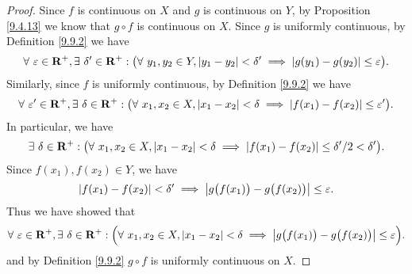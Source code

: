 \begin{proof}
    Since \(f\) is continuous on \(X\) and \(g\) is continuous on \(Y\), by Proposition \ref{9.4.13} we know that \(g \circ f\) is continuous on \(X\).
    Since \(g\) is uniformly continuous, by Definition \ref{9.9.2} we have
    \[
        \forall\ \varepsilon \in \mathbf{R}^+, \exists\ \delta' \in \mathbf{R}^+ : \big(\forall\ y_1, y_2 \in Y, \abs*{y_1 - y_2} < \delta' \implies \abs*{g(y_1) - g(y_2)} \leq \varepsilon\big).
    \]
    Similarly, since \(f\) is uniformly continuous, by Definition \ref{9.9.2} we have
    \[
        \forall\ \varepsilon' \in \mathbf{R}^+, \exists\ \delta \in \mathbf{R}^+ : \big(\forall\ x_1, x_2 \in X, \abs*{x_1 - x_2} < \delta \implies \abs*{f(x_1) - f(x_2)} \leq \varepsilon'\big).
    \]
    In particular, we have
    \[
        \exists\ \delta \in \mathbf{R}^+ : \big(\forall\ x_1, x_2 \in X, \abs*{x_1 - x_2} < \delta \implies \abs*{f(x_1) - f(x_2)} \leq \delta' / 2 < \delta'\big).
    \]
    Since \(f(x_1), f(x_2) \in Y\), we have
    \[
        \abs*{f(x_1) - f(x_2)} < \delta' \implies \abs*{g\big(f(x_1)\big) - g\big(f(x_2)\big)} \leq \varepsilon.
    \]
    Thus we have showed that
    \[
        \forall\ \varepsilon \in \mathbf{R}^+, \exists\ \delta \in \mathbf{R}^+ : \Big(\forall\ x_1, x_2 \in X, \abs*{x_1 - x_2} < \delta \implies \abs*{g\big(f(x_1)\big) - g\big(f(x_2)\big)} \leq \varepsilon\Big).
    \]
    and by Definition \ref{9.9.2} \(g \circ f\) is uniformly continuous on \(X\).
\end{proof}